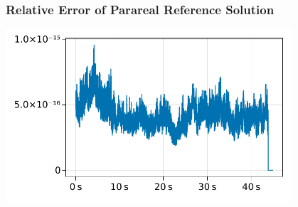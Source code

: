 \documentclass[
  aspectratio=1610,
]{beamer}
\begin{document}
\begin{frame}
  \frametitle{Relative Error of Parareal Reference Solution}
  \includegraphics[width=0.8\textwidth]{figures/slides-seq-parareal-ref.pdf}
\end{frame}
\end{document}
